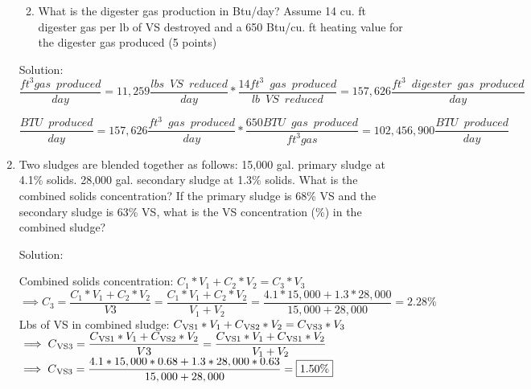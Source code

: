 \documentclass{article}
\begin{document}
\begin{enumerate}
\begin{enumerate}
\vspace{1cm}

\item  What is the digester gas production in Btu/day? Assume 14 cu. ft digester gas per lb of VS destroyed and a 650 Btu/cu. ft heating value for the digester gas produced (5 points)
\end{enumerate}
\vspace{1cm}
Solution:\\

$
	\dfrac 
	{
	ft^3 gas \enspace produced
	}
	{
	day
	}
	=
	11,259 \dfrac
			{
			lbs \enspace VS \enspace reduced
			}
			{
			day
			}
			*
		\dfrac
		{
		14 ft^3 \enspace gas \enspace produced
		}
		{
		lb \enspace VS \enspace reduced
		}
		=157,626 \dfrac
				{
				ft^3 \enspace digester \enspace 					gas \enspace produced
				}
				{
				day
				}
$
\\
\vspace{1cm}


$
	\dfrac 
	{
	BTU \enspace produced
	}
	{
	day
	}
	=
	157,626 \dfrac
			{
			ft^3 \enspace gas \enspace produced
			}
			{
			day
			}
			*
		\dfrac
		{
		650 BTU \enspace gas \enspace produced
		}
		{
		ft^3 gas
		}
		=\boxed{102,456,900 \dfrac
				{
				BTU \enspace produced
				}
				{
				day
				}}
$

\item Two sludges are blended together as follows: 15,000 gal. primary sludge at 4.1\% solids. 28,000 gal. secondary sludge at 1.3\% solids. What is the combined solids concentration?  If the primary sludge is 68\% VS and the secondary sludge is 63\% VS, what is the VS concentration (\%) in the combined sludge?

Solution:

Combined solids concentration:
$
C_1*V_1 + C_2*V_2 = C_3*V_3$\\
$\implies C_3 = \dfrac{C_1*V_1 + C_2*V_2}{V3}=\dfrac{C_1*V_1 + C_2*V_2}{V_1 + V_2}=\dfrac{4.1*15,000 + 1.3*28,000}{15,000 + 28,000}=\boxed{2.28\%}
$\\
Lbs of VS in combined sludge:
$
C\textsubscript{VS1}*V_1 + C\textsubscript{VS2}*V_2 = C\textsubscript{VS3}*V_3$\\
$\implies C\textsubscript{VS3} = \dfrac{C\textsubscript{VS1}*V_1 + C\textsubscript{VS2}*V_2}{V3}=\dfrac{C\textsubscript{VS1}*V_1 + C\textsubscript{VS1}*V_2}{V_1 + V_2}$\\
$\implies C\textsubscript{VS3}
=\dfrac{4.1*15,000*0.68 + 1.3*28,000*0.63}{15,000 + 28,000}=\boxed{1.50\%}$
\\



\end{enumerate}
\end{document}

